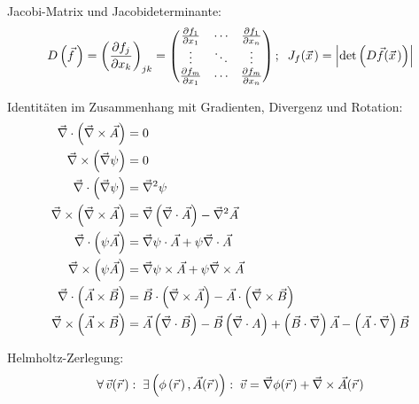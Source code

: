 			\noindent
			Jacobi-Matrix und Jacobideterminante:
			\begin{equation}
				D\left(\vec{f}\,\right) = \left(\frac{\partial f_j}{\partial x_k}\right)_{jk}
				= \left(\begin{matrix}
				\frac{\partial f_1}{\partial x_1} & \dotsb & \frac{\partial f_1}{\partial x_n} \\
				\vdots & \ddots & \vdots \\
				\frac{\partial f_m}{\partial x_1} & \dotsb & \frac{\partial f_m}{\partial x_n} \\
				\end{matrix}\right);\;\;J_f(\pvec{x})=\left|\det\left(D\vec{f}(\pvec{x})\right)\right|
			\end{equation}

			\noindent
			Identitäten im Zusammenhang mit Gradienten, Divergenz und Rotation:
			\begin{equation}
				\begin{aligned}
					\vec{\nabla}\cdot\left(\vec{\nabla}\times\vec{A}\right) &= 0 \\
					\vec{\nabla}\times\left(\vec{\nabla}\psi\right) &= 0 \\
					\vec{\nabla}\cdot\left(\vec{\nabla}\psi\right) &= \vec{\nabla}^2\psi \\
					\vec{\nabla}\times\left(\vec{\nabla}\times\vec{A}\right) &= \vec{\nabla}\left(\vec{\nabla}\cdot\vec{A}\right) -\vec{\nabla}^2\vec{A} \\
					\vec{\nabla}\cdot\left(\psi\vec{A}\right) &= \vec{\nabla}\psi\cdot\vec{A} + \psi\vec{\nabla}\cdot\vec{A}\\
					\vec{\nabla}\times\left(\psi\vec{A}\right) &= \vec{\nabla}\psi\times\vec{A} + \psi\vec{\nabla}\times\vec{A} \\
					\vec{\nabla}\cdot\left(\vec{A}\times\vec{B}\right) &= \vec{B}\cdot\left(\vec{\nabla}\times\vec{A}\right) - 	\vec{A}\cdot\left(\vec{\nabla}\times\vec{B}\right) \\
					\vec{\nabla}\times\left(\vec{A}\times\vec{B}\right) &= \vec{A}\left(\vec{\nabla}\cdot\vec{B}\right) - \vec{B}\left(\vec{\nabla}\cdot{A}\right) + \left(\vec{B}\cdot\vec{\nabla}\right)\vec{A} - \left(\vec{A}\cdot\vec{\nabla}\right)\vec{B} \\
				\end{aligned}
			\end{equation}

			\noindent
			Helmholtz-Zerlegung:
			\begin{equation}
				\forall \,\vec{v}(\pvec{r}):\; \exists\left(\phi\left(\pvec{r}\right),\vec{A}(\pvec{r})\right):\;\vec{v} = \Nabla\phi(\pvec{r}) + 	\Nabla\times\vec{A}(\pvec{r})
			\end{equation}

